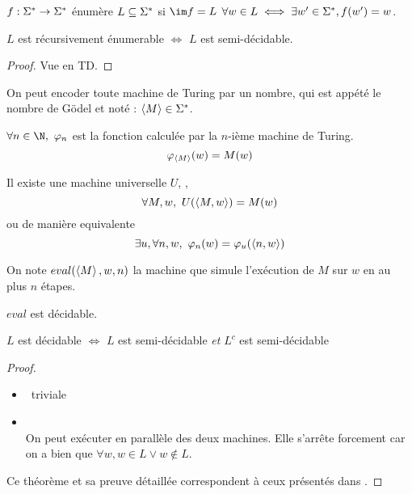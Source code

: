 \begin{definition}
	$f : \Sigma^{*} \to \Sigma^{*}$ énumère $L \subseteq \Sigma^{*}$ si $\im f = L$ \ie $\forall w \in L \iff \exists w' \in \Sigma^{*}, f (w') = w$.
\end{definition}

\begin{prop}
	$L$ est récursivement énumerable $\iff$ $L$ est semi-décidable.
\end{prop}

\begin{proof}
	Vue en TD.
\end{proof}


On peut encoder toute machine de Turing par un nombre, qui est appété le nombre de Gödel et noté : $\left\langle M\right\rangle \in \Sigma^{*}$.

\begin{definition} \label{def:enum}
	$\forall n \in \N, \ \phi_n$ est la fonction calculée par la $n$-ième machine de Turing.
	$$\varphi_{\left\langle M\right\rangle} (w) = M (w)$$
\end{definition}


\begin{lemma}\label{lem:univ}
	Il existe une machine universelle $U$, \ie, $$\forall M,w, \  U (\left\langle M,w\right\rangle) = M (w)$$
	ou de manière equivalente
	$$\exists u, \forall n,w, \ \varphi_n(w) = \varphi_u(\left\langle n,w\right\rangle)$$
\end{lemma}

\begin{definition}[eval]
	On note $eval(\left\langle M\right\rangle, w, n)$ la machine que simule l'exécution de $M$ sur $w$ en au plus $n$ étapes.
\end{definition}

\begin{prop}[Admis]
	$eval$ est décidable.
\end{prop}

\begin{prop}
	$L$ est décidable $\iff$ $L$ est semi-décidable \emph{et} $L^c$ est semi-décidable
\end{prop}

\begin{proof}
	\begin{itemize}
		\item \bimpLR \ triviale
		\item \bimpRL \\
		      On peut exécuter en parallèle des deux machines. Elle s'arrête forcement car on a bien que $\forall w, w \in L \lor w \notin L$.
	\end{itemize}
	Ce théorème et sa preuve détaillée correspondent à ceux présentés dans \cite[Theorem~4.22]{sipser}.
\end{proof}



